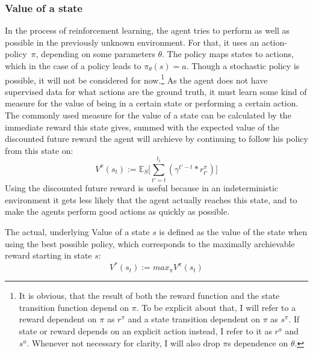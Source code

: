 \subsubsection{Value of a state}
In the process of reinforcement learning, the agent tries to perform as well as possible in the previously unknown environment. For that, it uses an \mbox{action-policy $\pi$,} depending on some parameters $\theta$. The policy maps states to actions, which in the case of a  policy leads to $\pi_\theta(s) = a$. Though a stochastic policy is possible, it will not be considered for now.\footnote{It is obvious, that the result of both the reward function and the state transition function depend on $\pi$. To be explicit about that, I will refer to a reward dependent on $\pi$ as $r^\pi$ and a state transition dependent on $\pi$ as $s^\pi$. If state or reward depends on an explicit action instead, I refer to it as $r^a$ and $s^a$. Whenever not necessary for clarity, I will also drop $\pi$s dependence on $\theta$.} As the agent does not have supervised data for what actions are the ground truth, it must learn some kind of measure for the value of being in a certain state or performing a certain action. The commonly used measure for the value of a state can be calculated by the immediate reward this state gives, summed with the expected value of the discounted future reward the agent will archieve by continuing to follow his policy from this state on: 
\begin{equation} \label{eq:1.1}
	V^\pi(s_t) := \mathds{E}_S \Big[ \sum_{t'=t}^{t_t} ( \gamma^{t'-t} * r^\pi_{t'} ) \Big]
\end{equation}
Using the discounted future reward is useful because in an indeterministic environment it gets less likely that the agent actually reaches this state, and to make the agents perform good actions as quickly as possible.

The actual, underlying Value of a state $s$ is defined as the value of the state when using the best possible policy, which corresponds to the maximally archievable reward starting in state $s$:
\begin{equation} \label{eq:1.15}
	V^*(s_t) := max_\pi V^\pi(s_t)
\end{equation}

